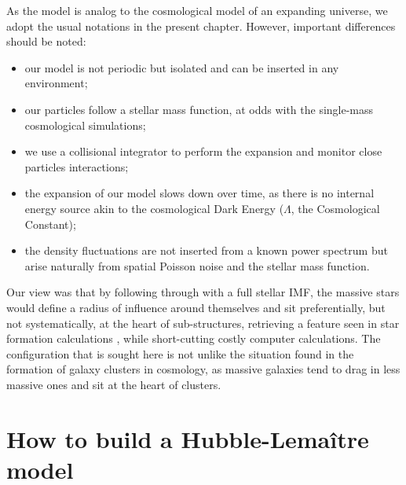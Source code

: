 As the model is analog to the cosmological model of an expanding universe, we adopt the usual notations in the present chapter. However, important differences should be noted:
\begin{itemize}
\item our model is not periodic but isolated and can be inserted in any environment;
\item our particles follow a stellar mass function, at odds with the single-mass cosmological simulations;
\item we use a collisional integrator to perform the expansion and monitor close particles interactions;
\item the expansion of our model slows down over time, as there is no internal energy source akin to the cosmological Dark Energy ($\Lambda$, the Cosmological Constant);
\item the density fluctuations are not inserted from a known power spectrum but arise naturally from spatial Poisson noise and the stellar mass function.
\end{itemize}

Our view was that by following through with a full stellar IMF, the massive stars would define a radius of influence around themselves and sit preferentially, but not systematically, at the heart of sub-structures, retrieving a feature seen in star formation calculations \citep{Moeckel2011,Maschberger2010}, while short-cutting  costly computer calculations. The configuration that is sought here is not unlike the situation found in the formation of galaxy clusters in cosmology, as massive galaxies tend to drag in less massive ones and sit at the heart of clusters.

%



\section{How to build a Hubble-Lema\^itre model}

